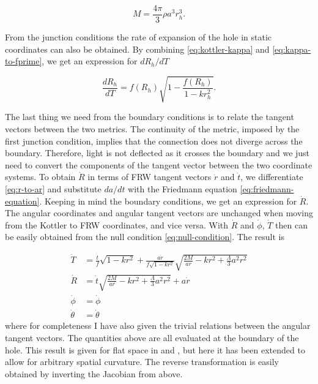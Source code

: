 \begin{equation}
  M = \frac{4\pi}{3} \rho a^3 r_h^3. 
  \label{eq:junction-conditions-mass-volume}
\end{equation}

From the junction conditions the rate of expansion of the hole in static coordinates can also be obtained. By combining \autoref{eq:kottler-kappa} and \autoref{eq:kappa-to-fprime}, we get an expression for $dR_h/dT$

\begin{equation}
  \frac{dR_h}{dT} = f(R_h) \sqrt{1- \frac{f(R_h)}{1-k r_h^2}}.
  \label{eq:hole-expansion-in-kottler-dR-dT}
\end{equation}

The last thing we need from the boundary conditions is to relate the tangent vectors between the two metrics. The continuity of the metric, imposed by the first junction condition, implies that the connection does not diverge across the boundary. Therefore, light is not deflected as it crosses the boundary and we just need to convert the components of the tangent vector between the two coordinate systems. To obtain $\dot{R}$ in terms of FRW tangent vectors $\dot{r}$ and $\dot{t}$, we differentiate \autoref{eq:r-to-ar} and substitute $da/dt$ with the Friedmann equation \autoref{eq:friedmann-equation}. Keeping in mind the boundary conditions, we get an expression for $\dot{R}$. The angular coordinates and angular tangent vectors are unchanged when moving from the Kottler to FRW coordinates, and vice versa. With $\dot{R}$ and $\dot{\phi}$, $\dot{T}$ then can be easily obtained from the null condition \autoref{eq:null-condition}. The result is

\begin{subequations}
  \begin{align}
    \dot{T} &= \frac{\dot{t}}{f}\sqrt{1-kr^2} + \frac{a\dot{r}}{f\sqrt{1-kr^2}} \sqrt{\frac{2M}{ar} - kr^2 + \frac{\Lambda}{3}a^2 r^2} \\
    \dot{R} &= \dot{t}\sqrt{\frac{2M}{ar} - kr^2 + \frac{\Lambda}{3}a^2 r^2} + a\dot{r}\\
    \dot{\phi} &= \dot{\phi}\\
    \dot{\theta} &= \dot{\theta}
  \end{align}
  \label{eq:kottler-to-frw-transform-jacobian}%
\end{subequations}
where for completeness I have also given the trivial relations between the angular tangent vectors. The quantities above are all evaluated at the boundary of the hole. This result is given for flat space in \citet{schucker2009strong} and \citet{fleury2013interpretation}, but here it has been extended to allow for arbitrary spatial curvature. The reverse transformation is easily obtained by inverting the Jacobian from above. 

